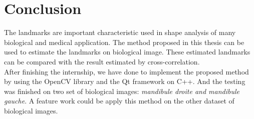 \chapter{Conclusion}
\indent The landmarks are important characteristic used in shape analysis of many biological and medical application. The method proposed in this thesis can be used to estimate the landmarks on biological image. These estimated landmarks can be compared with the result estimated by cross-correlation.\\[0.2cm]
\indent After finishing the internship, we have done to implement the proposed method by using the OpenCV library and the Qt framework on C++. And the testing was finished on two set of biological images: \textit{mandibule droite and mandibule gauche}. A feature work could be apply this method on the other dataset of biological images.
